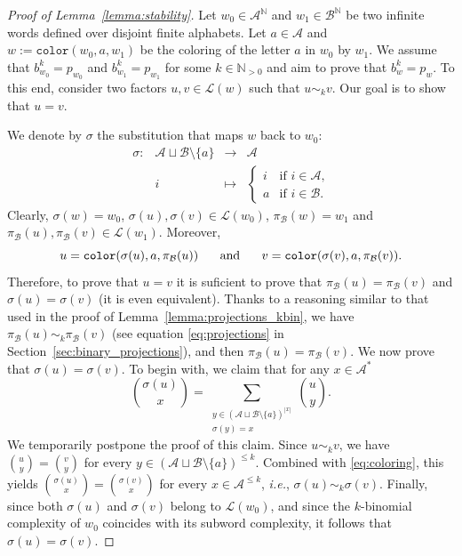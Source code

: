 \documentclass{template_arxiv}
\theoremstyle{definition}
\newcommand{\N}{\mathbb{N}}
\newcommand{\A}{\mathcal{A}}
\newcommand{\B}{\mathcal{B}}
\newcommand{\lan}{\mathcal{L}}
\newcommand{\colour}{\mathtt{color}}
\begin{document}
\begin{proof}[Proof of Lemma~\ref{lemma:stability}]
Let $w_0\in\A^\N$ and $w_1\in\B^\N$ be two infinite words defined over disjoint finite alphabets. Let $a\in\A$ and $w:=\colour(w_0,a,w_1)$ be the coloring of the letter $a$ in $w_0$ by $w_1$. We assume that $b_{w_0}^k=p_{w_0}$ and $b_{w_1}^k=p_{w_1}$ for some $k\in\N_{>0}$ and aim to prove that $b_w^k=p_w$. To this end, consider two factors $u,v\in\lan(w)$ such that $u\sim_k v$. Our goal is to show that $u=v$.

We denote by $\sigma$ the substitution that maps $w$ back to $w_0$:
\[
    \begin{array}{rccl}
        \sigma:&\A\sqcup\B\setminus\{a\}&\longrightarrow&\A\\
        & i & \longmapsto & \begin{cases} i &\text{if $i\in\A$,} \\ a &\text{if $i\in\B$.}\end{cases}
    \end{array}
\]
Clearly, $\sigma(w)=w_0$, $\sigma(u),\sigma(v)\in\lan(w_0)$, $\pi_\B(w)=w_1$ and $\pi_\B(u),\pi_\B(v)\in\lan(w_1)$. Moreover,
\[
    u=\colour(\sigma(u),a,\pi_{\B}(u)) \hspace{0.5cm} \text{ and }\hspace{0.5cm} v=\colour(\sigma(v),a,\pi_\B(v)).
\]
Therefore, to prove that $u=v$ it is suficient to prove that $\pi_{\B}(u)=\pi_\B(v)$ and $\sigma(u)=\sigma(v)$ (it is even equivalent). Thanks to a reasoning similar to that used in the proof of Lemma~\ref{lemma:projections_kbin}, we have $\pi_\B(u)\sim_k\pi_\B(v)$ (see equation \eqref{eq:projections} in Section~\ref{sec:binary_projections}), and then $\pi_\B(u)=\pi_\B(v)$. We now prove that $\sigma(u)=\sigma(v)$. To begin with, we claim that for any $x\in\A^*$
\begin{equation}\label{eq:coloring}
    \binom{\sigma(u)}{x}=\sum\limits_{\substack{y\in(\A\sqcup\B\setminus\{a\})^{|x|} \\ \sigma(y)=x}} \binom{u}{y}.
\end{equation}
We temporarily postpone the proof of this claim. Since $u\sim_k v$, we have $\binom{u}{y}=\binom{v}{y}$ for every $y\in(\A\sqcup\B\setminus\{a\})^{\leq k}$. Combined with \eqref{eq:coloring}, this yields $\binom{\sigma(u)}{x}=\binom{\sigma(v)}{x}$ for every $x\in\A^{\leq k}$, \emph{i.e.}, $\sigma(u)\sim_k\sigma(v)$. Finally, since both $\sigma(u)$ and $\sigma(v)$ belong to $\lan(w_0)$, and since the $k$-binomial complexity of $w_0$ coincides with its subword complexity, it follows that $\sigma(u)=\sigma(v)$.


\end{proof}
\end{document}
